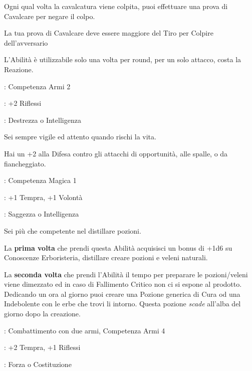 \begin{multicols}{2}
Ogni qual volta la cavalcatura viene colpita, puoi effettuare una prova di Cavalcare per negare il colpo.

La tua prova di Cavalcare deve essere maggiore del Tiro per Colpire dell'avversario

L'Abilità è utilizzabile solo una volta per round, per un solo attacco, costa la Reazione.

\begin{description}[noitemsep, topsep=0pt, parsep=0pt, partopsep=0pt, leftmargin=0cm, labelwidth=2.5cm]
    \item[\textbf{Requisito}]: Competenza Armi 2
    \item[\textbf{Tiri Salvezza}]: +2 Riflessi
    \item[\textbf{Caratteristica}]: Destrezza o Intelligenza
\end{description}

Sei sempre vigile ed attento quando rischi la vita.

Hai un +2 alla Difesa contro gli attacchi di opportunità, alle spalle, o da fiancheggiato.

\begin{description}[noitemsep, topsep=0pt, parsep=0pt, partopsep=0pt, leftmargin=0cm, labelwidth=2.5cm]
    \item[\textbf{Requisito}]: Competenza Magica 1
    \item[\textbf{Tiri Salvezza}]: +1 Tempra, +1 Volontà
    \item[\textbf{Caratteristica}]: Saggezza o Intelligenza
\end{description}

Sei più che competente nel distillare pozioni.

La \textbf{prima volta} che prendi questa Abilità acquisisci un bonus di +1d6 su Conoscenze Erboristeria, distillare creare pozioni e veleni naturali.

La \textbf{seconda volta} che prendi l'Abilità il tempo per preparare le pozioni/veleni viene dimezzato ed in caso di Fallimento Critico non ci si espone al prodotto. Dedicando un ora al giorno puoi creare una Pozione generica di Cura od una Indebolente con le erbe che trovi li intorno. Questa pozione \emph{scade} all'alba del giorno dopo la creazione.

\begin{description}[noitemsep, topsep=0pt, parsep=0pt, partopsep=0pt, leftmargin=0cm, labelwidth=2.5cm]
    \item[\textbf{Requisito}]: Combattimento con due armi, Competenza Armi 4
    \item[\textbf{Tiri Salvezza}]: +2 Tempra, +1 Riflessi
    \item[\textbf{Caratteristica}]: Forza o Costituzione
\end{description}


\end{multicols}
